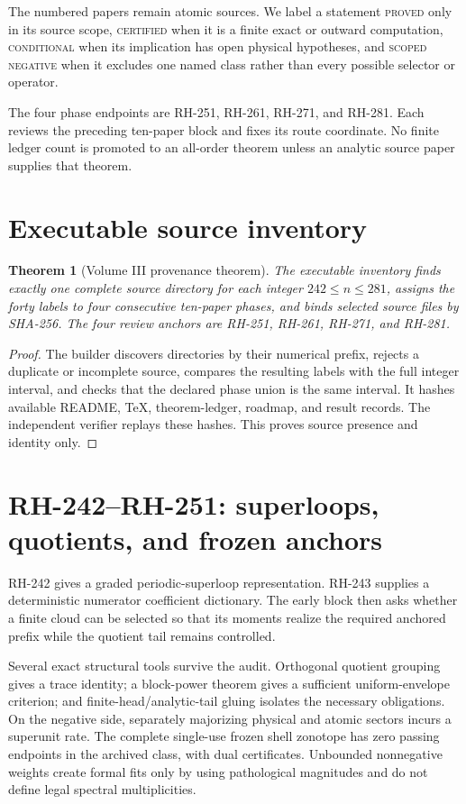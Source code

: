 \documentclass[11pt]{article}
\newtheorem{theorem}{Theorem}[section]
\theoremstyle{definition}
\theoremstyle{remark}
\begin{document}
The numbered papers remain atomic sources.  We label a statement
\textsc{proved} only in its source scope, \textsc{certified} when it is a
finite exact or outward computation, \textsc{conditional} when its implication
has open physical hypotheses, and \textsc{scoped negative} when it excludes
one named class rather than every possible selector or operator.

The four phase endpoints are RH-251, RH-261, RH-271, and RH-281.  Each reviews
the preceding ten-paper block and fixes its route coordinate.  No finite
ledger count is promoted to an all-order theorem unless an analytic source
paper supplies that theorem.

\section{Executable source inventory}

\begin{theorem}[Volume III provenance theorem]\label{thm:provenance}
The executable inventory finds exactly one complete source directory for each
integer $242\le n\le281$, assigns the forty labels to four consecutive
ten-paper phases, and binds selected source files by SHA-256.  The four review
anchors are RH-251, RH-261, RH-271, and RH-281.
\end{theorem}
\begin{proof}
The builder discovers directories by their numerical prefix, rejects a
duplicate or incomplete source, compares the resulting labels with the full
integer interval, and checks that the declared phase union is the same
interval.  It hashes available README, TeX, theorem-ledger, roadmap, and
result records.  The independent verifier replays these hashes.  This proves
source presence and identity only.
\end{proof}

\section{RH-242--RH-251: superloops, quotients, and frozen anchors}

RH-242 gives a graded periodic-superloop representation.  RH-243 supplies a
deterministic numerator coefficient dictionary.  The early block then asks
whether a finite cloud can be selected so that its moments realize the
required anchored prefix while the quotient tail remains controlled.

Several exact structural tools survive the audit.  Orthogonal quotient
grouping gives a trace identity; a block-power theorem gives a sufficient
uniform-envelope criterion; and finite-head/analytic-tail gluing isolates the
necessary obligations.  On the negative side, separately majorizing physical
and atomic sectors incurs a superunit rate.  The complete single-use frozen
shell zonotope has zero passing endpoints in the archived class, with dual
certificates.  Unbounded nonnegative weights create formal fits only by using
pathological magnitudes and do not define legal spectral multiplicities.
\end{document}
